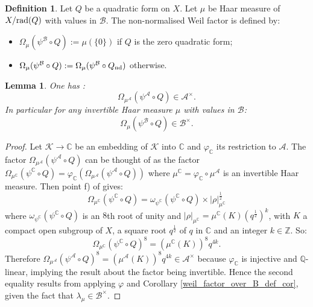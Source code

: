 \documentclass[11pt]{article}
\theoremstyle{plain}
\newtheorem{lem}[theo]{Lemma}
\theoremstyle{definition}
\newtheorem{defi}[theo]{Definition}
\theoremstyle{plain}
\theoremstyle{definition}
\theoremstyle{plain}
\begin{document}
\begin{defi} Let $Q$ be a quadratic form on $X$. Let $\mu$ be Haar measure of $X/\textup{rad}(Q)$ with values in $\mathcal{B}$. The non-normalised Weil factor is defined by:
\begin{itemize}
\item $\Omega_\mu(\psi^\mathcal{B} \circ Q) := \mu(\{0\})$ if $Q$ is the zero quadratic form;
\item $\Omega_\mu(\psi^\mathcal{B} \circ Q) : = \Omega_\mu (\psi^\mathcal{B} \circ Q_{\textup{nd}})$ otherwise. \end{itemize} \end{defi}

\begin{lem} One has :
$$\Omega_{\mu^\mathcal{A}}(\psi^\mathcal{A} \circ Q) \in \mathcal{A}^\times.$$
In particular for any invertible Haar measure $\mu$ with values in $\mathcal{B}$:
$$\Omega_\mu(\psi^\mathcal{B} \circ Q) \in \mathcal{B}^\times.$$ \end{lem}

\begin{proof} Let $\mathcal{K} \to \mathbb{C}$ be an embedding of $\mathcal{K}$ into $\mathbb{C}$ and $\varphi_\mathbb{C}$ its restriction to $\mathcal{A}$. The factor $\Omega_{\mu^\mathcal{A}}(\psi^\mathcal{A} \circ Q)$ can be thought of as the factor $\Omega_{\mu^\mathbb{C}}(\psi^\mathbb{C} \circ Q) = \varphi_\mathbb{C} (\Omega_{\mu^\mathcal{A}}(\psi^\mathcal{A} \circ Q))$ where $\mu^\mathbb{C}= \varphi_\mathbb{C} \circ \mu^\mathcal{A}$ is an invertible Haar measure. Then point f) of \cite[Prop. 1.5]{trias_theta1} gives:
$$\Omega_{\mu^\mathbb{C}}(\psi^\mathbb{C} \circ Q) = \omega_{\psi^\mathbb{C}}(\psi^\mathbb{C} \circ Q) \times |\rho|_{\mu^\mathbb{C}}^{\frac{1}{2}}$$
where $\omega_{\psi^\mathbb{C}}(\psi^\mathbb{C} \circ Q)$ is an $8$th root of unity and $|\rho|_{\mu^\mathbb{C}} = \mu^\mathbb{C}(K) (q^{\frac{1}{2}})^k$, with $K$ a compact open subgroup of $X$, a square root $q^{\frac{1}{2}}$ of $q$ in $\mathbb{C}$ and an integer $k \in \mathbb{Z}$. So:
$$\Omega_{\mu^\mathbb{C}}(\psi^\mathbb{C} \circ Q)^8= (\mu^\mathbb{C}(K))^8 q^{4k}.$$
Therefore $\Omega_{\mu^\mathcal{A}}(\psi^\mathcal{A} \circ Q)^8 =(\mu^\mathcal{A}(K))^8 q^{4k} \in \mathcal{A}^\times$ because $\varphi_\mathbb{C}$ is injective and $\mathbb{Q}$-linear, implying the result about the factor being invertible. Hence the second equality results from applying $\varphi$ and Corollary \ref{weil_factor_over_B_def_cor}, given the fact that $\lambda_\mu \in \mathcal{B}^\times$. \end{proof}
\end{document}
